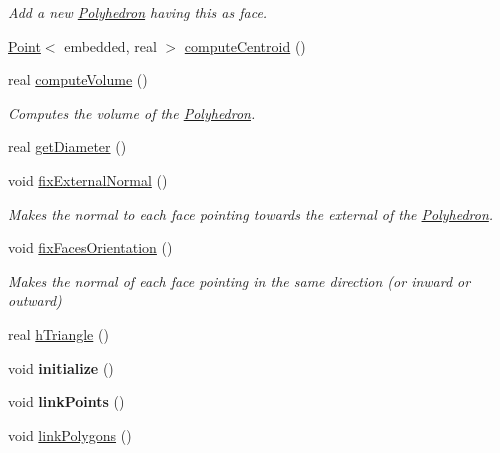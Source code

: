 \begin{DoxyCompactItemize}
\begin{DoxyCompactList}\small\item\em \-Add a new \hyperlink{class_polyhedron}{\-Polyhedron} having this as face. \end{DoxyCompactList}\item 
\hyperlink{class_point}{\-Point}$<$ embedded, real $>$ \hyperlink{class_polyhedron_a8fa603a39f094cba868b90c5087a9f01}{compute\-Centroid} ()
\item 
real \hyperlink{class_polyhedron_abc5b54102a217358bb0f3af69fdaf6f4}{compute\-Volume} ()
\begin{DoxyCompactList}\small\item\em \-Computes the volume of the \hyperlink{class_polyhedron}{\-Polyhedron}. \end{DoxyCompactList}\item 
real \hyperlink{class_polyhedron_acec44568add44445f3d87cc1673083aa}{get\-Diameter} ()
\item 
void \hyperlink{class_polyhedron_ace36af0e1b0638f3a0cb6ac2f828cba9}{fix\-External\-Normal} ()
\begin{DoxyCompactList}\small\item\em \-Makes the normal to each face pointing towards the external of the \hyperlink{class_polyhedron}{\-Polyhedron}. \end{DoxyCompactList}\item 
void \hyperlink{class_polyhedron_ab5a7edbaf82c77541bb7ed67eef1af78}{fix\-Faces\-Orientation} ()
\begin{DoxyCompactList}\small\item\em \-Makes the normal of each face pointing in the same direction (or inward or outward) \end{DoxyCompactList}\item 
real \hyperlink{class_polyhedron_ae055b1e499fc2ac20f0db25379c30390}{h\-Triangle} ()
\item 
\hypertarget{class_polyhedron_a9a64a02c8d5d1afd6c5d0ff4d0b6bcb4}{void {\bfseries initialize} ()}\label{class_polyhedron_a9a64a02c8d5d1afd6c5d0ff4d0b6bcb4}

\item 
\hypertarget{class_polyhedron_a2f266d7dac199c4ff5ceb7d06b1c4a3d}{void {\bfseries link\-Points} ()}\label{class_polyhedron_a2f266d7dac199c4ff5ceb7d06b1c4a3d}

\item 
\hypertarget{class_polyhedron_aafd989af8eb6e5728fd2791049100f41}{void \hyperlink{class_polyhedron_aafd989af8eb6e5728fd2791049100f41}{link\-Polygons} ()}\label{class_polyhedron_aafd989af8eb6e5728fd2791049100f41}


\end{DoxyCompactItemize}
